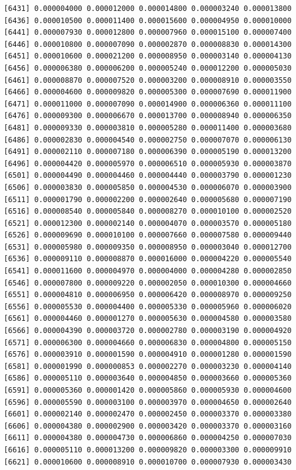 \documentclass[]{article}
\begin{document}
\begin{verbatim}
 [6431] 0.000004000 0.000012000 0.000014800 0.000003240 0.000013800
 [6436] 0.000010500 0.000011400 0.000015600 0.000004950 0.000010000
 [6441] 0.000007930 0.000012800 0.000007960 0.000015100 0.000007400
 [6446] 0.000010800 0.000007090 0.000002870 0.000008830 0.000014300
 [6451] 0.000010600 0.000021200 0.000008950 0.000003140 0.000004130
 [6456] 0.000006380 0.000006200 0.000005240 0.000012200 0.000005030
 [6461] 0.000008870 0.000007520 0.000003200 0.000008910 0.000003550
 [6466] 0.000004600 0.000009820 0.000005300 0.000007690 0.000011900
 [6471] 0.000011000 0.000007090 0.000014900 0.000006360 0.000011100
 [6476] 0.000009300 0.000006670 0.000013700 0.000008940 0.000006350
 [6481] 0.000009330 0.000003810 0.000005280 0.000011400 0.000003680
 [6486] 0.000002830 0.000004540 0.000002750 0.000007070 0.000006130
 [6491] 0.000002110 0.000007180 0.000006390 0.000005190 0.000013200
 [6496] 0.000004420 0.000005970 0.000006510 0.000005930 0.000003870
 [6501] 0.000004490 0.000004460 0.000004440 0.000003790 0.000001230
 [6506] 0.000003830 0.000005850 0.000004530 0.000006070 0.000003900
 [6511] 0.000001790 0.000002200 0.000002640 0.000005680 0.000007190
 [6516] 0.000008540 0.000005840 0.000008270 0.000010100 0.000002520
 [6521] 0.000012300 0.000002140 0.000004070 0.000003570 0.000005180
 [6526] 0.000009690 0.000010100 0.000007660 0.000007580 0.000009440
 [6531] 0.000005980 0.000009350 0.000008950 0.000003040 0.000012700
 [6536] 0.000009110 0.000008870 0.000016000 0.000004220 0.000005540
 [6541] 0.000011600 0.000004970 0.000004000 0.000004280 0.000002850
 [6546] 0.000007800 0.000009220 0.000002050 0.000010300 0.000004660
 [6551] 0.000004810 0.000006950 0.000006420 0.000008970 0.000009250
 [6556] 0.000005530 0.000004400 0.000005330 0.000005960 0.000006020
 [6561] 0.000004460 0.000001270 0.000005630 0.000004580 0.000003580
 [6566] 0.000004390 0.000003720 0.000002780 0.000003190 0.000004920
 [6571] 0.000006300 0.000004660 0.000006830 0.000004800 0.000005150
 [6576] 0.000003910 0.000001590 0.000004910 0.000001280 0.000001590
 [6581] 0.000001990 0.000000853 0.000002270 0.000003230 0.000004140
 [6586] 0.000005110 0.000003640 0.000004850 0.000003660 0.000005360
 [6591] 0.000005360 0.000001420 0.000005860 0.000005930 0.000004600
 [6596] 0.000005590 0.000003100 0.000003970 0.000004650 0.000002640
 [6601] 0.000002140 0.000002470 0.000002450 0.000003370 0.000003380
 [6606] 0.000004380 0.000002900 0.000003420 0.000003370 0.000003160
 [6611] 0.000004380 0.000004730 0.000006860 0.000004250 0.000007030
 [6616] 0.000005110 0.000013200 0.000009820 0.000003300 0.000009910
 [6621] 0.000010600 0.000008910 0.000010700 0.000007930 0.000003430

\end{verbatim}
\end{document}
